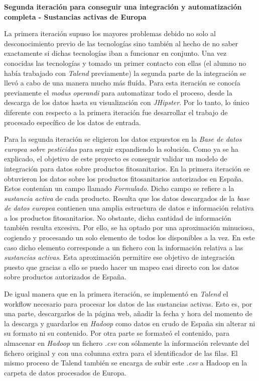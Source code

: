 \par 
\textbf{Segunda iteración para conseguir una integración y automatización completa - Sustancias activas de Europa}
\bigskip
\par 
La primera iteración supuso los mayores problemas debido no solo al desconocimiento previo de las tecnologías sino también al hecho de no saber exactamente si dichas tecnologías iban a funcionar en conjunto. Una vez conocidas las tecnologías y tomado un primer contacto con ellas (el alumno no había trabajado con \textit{Talend} previamente) la segunda parte de la integración se llevó a cabo de una manera mucho más fluída. Para esta iteración se conocía previamente el \textit{modus operandi} para automatizar todo el proceso, desde la descarga de los datos hasta su visualización con \textit{JHipster}. Por lo tanto, lo único diferente con respecto a la primera iteración fue desarrollar el trabajo de procesado específico de los datos de entrada. 
\par  
Para la segunda iteración se eligieron los datos expuestos en la \textit{Base de datos europea sobre pesticidas} \cite{pesticides_eu} para seguir expandiendo la solución. Como ya se ha explicado, el objetivo de este proyecto es conseguir validar un modelo de integración para datos sobre productos fitosanitarios. En la primera iteración se obtuvieron los datos sobre los productos fitosanitarios autorizados en España. Estos contenían un campo llamado \textit{Formulado}. Dicho campo se refiere a la \textit{sustancia activa} de cada producto. Resulta que los datos descargados de la \textit{base de datos europea} contienen una amplia estructura de datos e información relativa a los productos fitosanitarios. No obstante, dicha cantidad de información también resulta excesiva. Por ello, se ha optado por una aproximación minuciosa, cogiendo y procesando un solo elemento de todos los disponibles a la vez. En este caso dicho elemento corresponde a un fichero con la información relativa a las \textit{sustancias activas}. Esta aproximación permitire ese objetivo de integración puesto que gracias a ello se puedo hacer un mapeo casi directo con los datos sobre productos autorizados de España. 
\par 
De igual manera que en la primera iteración, se implementó en \textit{Talend} el workflow necesario para procesar los datos de las sustancias activas. Esto es, por una parte, descargarlos de la página web, añadir la fecha y hora del momento de la descarga y guardarlos en \textit{Hadoop} como datos en crudo de España sin alterar ni su formato ni su contenido. Por otra parte se formateó el contenido, para almacenar en \textit{Hadoop} un fichero \textit{.csv} con sólamente la información relevante del fichero original y con una columna extra para el identificador de las filas. El mismo proceso de Talend también se encarga de subir este \textit{.csv} a Hadoop en la carpeta de datos procesados de Europa. 
